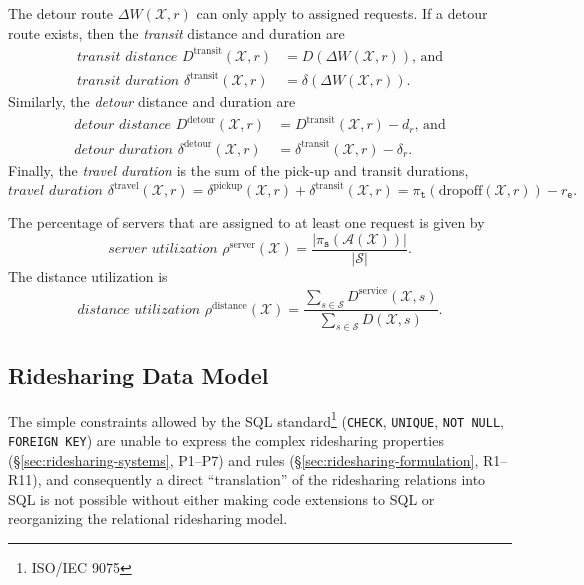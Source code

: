 \documentclass{article}
\newcommand{\hi}[1]{\noindent {\bf #1}}     %
\theoremstyle{definition}                   %
\begin{document}
The detour route $\Delta W(\mathcal{X},r)$ can only apply to assigned requests. If
a detour route exists, then
the \emph{transit} distance and duration are
\begin{align}
\label{eq:transit-distance}
\textit{transit distance }D^\textrm{transit}(\mathcal{X},r)&=D(\Delta W(\mathcal{X},r))\textrm{, and}\\
\label{eq:transit-duration}
\textit{transit duration }\delta^\textrm{transit}(\mathcal{X},r)&=\delta(\Delta W(\mathcal{X},r)).
\end{align}
Similarly, the \emph{detour} distance and duration are
\begin{align}
\label{eq:detour-distance}
\textit{detour distance }D^\textrm{detour}(\mathcal{X},r)&=D^\textrm{transit}(\mathcal{X},r)-d_r\textrm{, and}\\
\label{eq:detour-duration}
\textit{detour duration }\delta^\textrm{detour}(\mathcal{X},r)&=\delta^\textrm{transit}(\mathcal{X},r)-\delta_r.
\end{align}
Finally, the \emph{travel duration} is the sum of the pick-up and transit durations,
\begin{equation}
\label{eq:travel-duration}
\textit{travel duration }\delta^\textrm{travel}(\mathcal{X},r)=\delta^\textrm{pickup}(\mathcal{X},r)+\delta^\textrm{transit}(\mathcal{X},r)
=\pi_\texttt{t}(\textrm{dropoff}(\mathcal{X},r))-r_\texttt{e}.
\end{equation}

\hi{Utilization.}
The percentage of servers that are assigned to at least one request is given by
\begin{equation}
\label{eq:server-utilization}
\textit{server utilization }\rho^\textrm{server}(\mathcal{X})=\frac{|\pi_\texttt{s}(\mathcal{A}(\mathcal{X}))|}{|\mathcal{S}|}.
\end{equation}
The distance utilization is
\begin{equation}
\label{eq:distance-utilization}
\textit{distance utilization }\rho^\textrm{distance}(\mathcal{X})=
\frac{\sum_{s\in\mathcal{S}}D^\textrm{service}(\mathcal{X},s)}
{\sum_{s\in\mathcal{S}}D(\mathcal{X},s)}.
\end{equation}

\subsection{Ridesharing Data Model}
\label{sec:ridesharing-data-model}
The simple constraints allowed by the SQL standard\footnote{ISO/IEC 9075}
(\texttt{CHECK}, \texttt{UNIQUE}, \texttt{NOT NULL}, \texttt{FOREIGN KEY}) are
unable to express the complex ridesharing properties
(\S\ref{sec:ridesharing-systems}, P1--P7) and rules
(\S\ref{sec:ridesharing-formulation}, R1--R11), and consequently a direct
``translation'' of the ridesharing relations into SQL is not possible without
either making code extensions to SQL or reorganizing the relational ridesharing
model.
\end{document}
